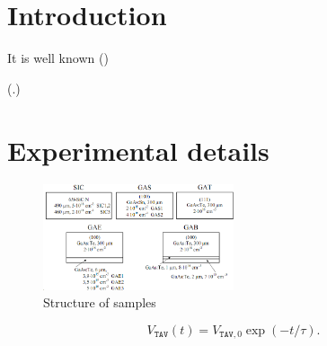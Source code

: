 \documentclass[final,3p,times,twocolumn,authoryear]{elsarticle}
\begin{document}

\section{Introduction}\label{sec1}



It is well known (\cite{KozlovsEn,RadiationEffectsBook})

(\cite{MW:Rev,ZOHM2000,BHUNIA1998,Bacherikov2003En,Pashkov1994En,
BoltovetsEn,Milenin1994En,BelyaevIntac,ASHKINADZE1996,ProcSPIE,Belyaev1998JTFEn,
Bacherikov2008En,Konakova2015En,Konakova2012FTPEn}.)


 \cite{MW:Rev,ZOHM2000}

\cite{MW:Rev}

\cite{MW:Rev,BHUNIA1998}

\cite{BoltovetsEn,Pashkov1994En,Milenin1994En,BelyaevIntac,ProcSPIE,Konakova2015En,Konakova2012FTPEn}

\cite{Bacherikov2003En}

\cite{Bacherikov2003En,Belyaev1998JTFEn,Konakova2015En}

\cite{Milenin1994En}

\cite{Belyaev1998JTFEn}

\cite{Bacherikov2008En}

\cite{BelyaevIntac,ProcSPIE,Belyaev1998JTFEn}


\section{Experimental details}\label{sec2}

\cite{BoltovetsEn,Milenin1994En,BelyaevIntac,ASHKINADZE1996,ProcSPIE}


\begin{figure}
\center
\includegraphics[width=0.5\textwidth]{Fig1}
\caption{\label{figSamp_TAV}
Structure of samples}%
\end{figure}


\cite{OstrovPAN,OlikhSSC,PANnewEn,OstrovskiiSST}

\begin{equation}\label{eqVtav}
  V_\mathtt{TAV}(t)=V_{\mathtt{TAV},0}\exp(-t/\tau).
\end{equation}
\end{document}
